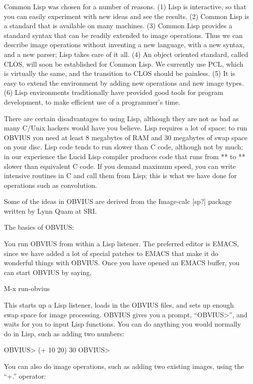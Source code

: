 Common Lisp was chosen for a number of reasons.  (1) Lisp is
interactive, so that you can easily experiment with new ideas and see
the results.  (2) Common Lisp is a standard that is available on many
machines.  (3) Common Lisp provides a standard syntax that can be
readily extended to image operations.  Thus we can describe image
operations without inventing a new language, with a new syntax, and a
new parser; Lisp takes care of it all.  (4) An object oriented
standard, called CLOS, will soon be established for Common Lisp.  We
currently use PCL, which is virtually the same, and the transition to
CLOS should be painless. (5) It is easy to extend the environment by
adding new operations and new image types. (6) Lisp environments
traditionally have provided good tools for program development, to
make efficient use of a programmer's time.

There are certain disadvantages to using Lisp, although they are not
as bad as many C/Unix hackers would have you believe.  Lisp requires a
lot of space: to run OBVIUS you need at least 8 megabytes of RAM and 30
megabytes of swap space on your disc.  Lisp code tends to run slower
than C code, although not by much; in our experience the Lucid Lisp
compiler produces code that runs from ** to ** slower than equivalent
C code.  If you demand maximum speed, you can write intensive routines
in C and call them from Lisp; this is what we have done for operations
such as convolution.

Some of the ideas in OBVIUS are derived from the Image-calc [sp?]
package written by Lynn Quam at SRI.




The basics of OBVIUS:

You run OBVIUS from within a Lisp listener.
The preferred editor is EMACS, since we have added a lot of
special patches to EMACS that make it do wonderful things with
OBVIUS. Once you have opened an EMACS buffer, you can start OBVIUS by
saying,

M-x run-obvius

This starts up a Lisp listener, loads in the OBVIUS files, and
sets up enough swap space for image processing.
OBVIUS gives you a prompt, ``OBVIUS>'',
and waits for you to input Lisp functions.  You can do anything
you would normally do in Lisp, such as adding two numbers:

OBVIUS> (+ 10 20)
30
OBVIUS>

You can also do image operations, such as adding two existing images,
using the ``+.'' operator:


